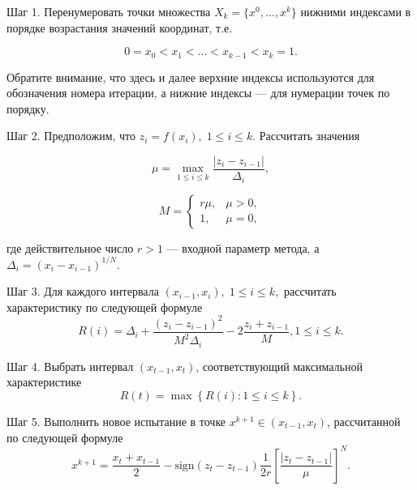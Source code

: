 \documentclass[mathematics,article,accept,pdftex,moreauthors]{Definitions/mdpi}
\begin{document}
Шаг 1. Перенумеровать точки множества $X_k=\{x^0,\dots,x^k\}$ нижними индексами в порядке возрастания значений координат, т.е.
\begin{linenomath}
\begin{equation}
0=x_0<x_1<\dots <x_{k-1}<x_{k}=1.
\end{equation}
\end{linenomath}
Обратите внимание, что здесь и далее верхние индексы используются для обозначения номера итерации, а нижние индексы — для нумерации точек по порядку.

Шаг 2. Предположим, что $z_i=f(x_i), \; 1\leq i \leq k$. Рассчитать значения
\begin{linenomath}
\begin{equation}\label{mu}
\mu = \max_{1\leq i \leq k}\frac{\left|z_i-z_{i-1}\right|}{\Delta_i},
\end{equation}
\end{linenomath}
\begin{linenomath}
\begin{equation}
M = \left\{
   \begin{array}{lr}
     r\mu, & \mu > 0,\\
     1, & \mu = 0,
   \end{array}
\right.
\end{equation}
\end{linenomath}
где действительное число $r>1$ — входной параметр метода, а $\Delta_i=\left(x_i-x_{i-1}\right)^{1/N}$.


Шаг 3. Для каждого интервала $(x_{i-1}, x_i), \; 1\leq i \leq k,$ рассчитать характеристику по следующей формуле
\begin{equation}\label{R}
R(i)=\Delta_i+\frac{(z_i-z_{i-1})^2}{M^2\Delta_i}-2\frac{z_i+z_{i-1}}{M},1 \leq i \leq k.
\end{equation}


Шаг 4. Выбрать интервал $(x_{t-1},x_t)$, соответствующий максимальной характеристике
\begin{equation}\label{MaxR}
R(t)=\max{\left\{R(i): 1 \leq i \leq k \right\}}.
\end{equation}

Шаг 5. Выполнить новое испытание в точке $x^{k+1}\in(x_{t-1},x_t)$, рассчитанной по следующей формуле
\begin{equation}\label{NewX}
x^{k+1} = \frac{x_t+x_{t-1}}{2} - \mathrm{sign}(z_t-z_{t-1})\frac{1}{2r}\left[\frac{\left|z_t-z_{t-1}\right|}{\mu}\right]^N.
\end{equation}
\end{document}
